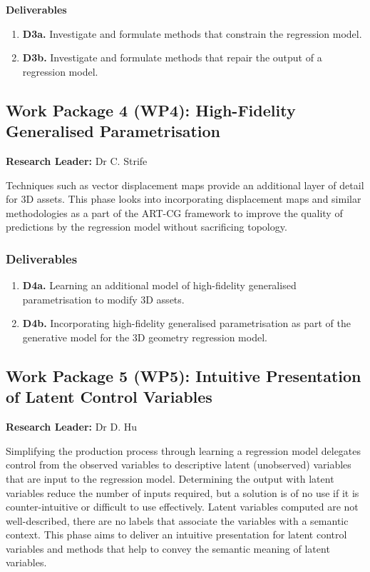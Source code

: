 \documentclass[a4paper, 11pt, onecolumn]{article} %
\numberwithin{equation}{section} %
\numberwithin{figure}{section} %
\numberwithin{table}{section} %
\begin{document}
\textbf{Deliverables}
\begin{enumerate}
	\item \textbf{D3a.} Investigate and formulate methods that constrain the regression model.
	\item \textbf{D3b.} Investigate and formulate methods that repair the output of a regression model.
\end{enumerate}

\subsection*{Work Package 4 (WP4): High-Fidelity Generalised Parametrisation}
\textbf{Research Leader:} Dr C. Strife\par

Techniques such as vector displacement maps provide an additional layer of detail for 3D assets. This phase looks into incorporating displacement maps and similar methodologies as a part of the ART-CG framework to improve the quality of predictions by the regression model without sacrificing topology.

\subsubsection*{Deliverables} 
\begin{enumerate}
	\item \textbf{D4a.} Learning an additional model of high-fidelity generalised parametrisation to modify 3D assets.
	\item \textbf{D4b.} Incorporating high-fidelity generalised parametrisation as part of the generative model for the 3D geometry regression model.
\end{enumerate}

\subsection*{Work Package 5 (WP5): Intuitive Presentation of Latent Control Variables}
\textbf{Research Leader:} Dr D. Hu\par

Simplifying the production process through learning a regression model delegates control from the observed variables to descriptive latent (unobserved) variables that are input to the regression model. Determining the output with latent variables reduce the number of inputs required, but a solution is of no use if it is counter-intuitive or difficult to use effectively. Latent variables computed are not well-described, there are no labels that associate the variables with a semantic context. This phase aims to deliver an intuitive presentation for latent control variables and methods that help to convey the semantic meaning of latent variables.
\end{document}
